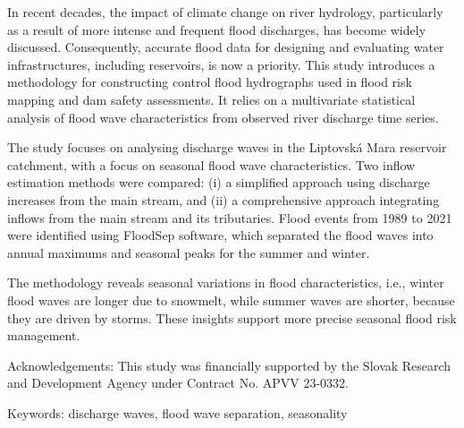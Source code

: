 In recent decades, the impact of climate change on river hydrology, particularly as a result of more intense and frequent flood discharges, has become widely discussed. Consequently, accurate flood data for designing and evaluating water infrastructures, including reservoirs, is now a priority. This study introduces a methodology for constructing control flood hydrographs used in flood risk mapping and dam safety assessments. It relies on a multivariate statistical analysis of flood wave characteristics from observed river discharge time series.

The study focuses on analysing discharge waves in the Liptovská Mara reservoir catchment, with a focus on seasonal flood wave characteristics. Two inflow estimation methods were compared: (i) a simplified approach using discharge increases from the main stream, and (ii) a comprehensive approach integrating inflows from the main stream and its tributaries. Flood events from 1989 to 2021 were identified using FloodSep software, which separated the flood waves into annual maximums and seasonal peaks for the summer and winter. 

The methodology reveals seasonal variations in flood characteristics, i.e., winter flood waves are longer due to snowmelt, while summer waves are shorter, because they are driven by storms. These insights support more precise seasonal flood risk management.

Acknowledgements: This study was financially supported by the Slovak Research and Development Agency under Contract No. APVV 23-0332. 

Keywords: discharge waves, flood wave separation, seasonality


\newpage{}
{}
\begin{flushleft}





\end{flushleft}

